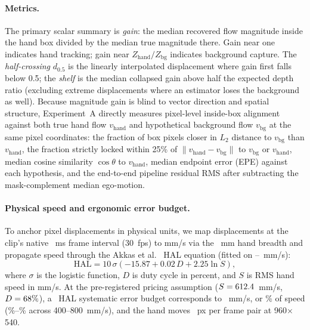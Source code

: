 \documentclass[11pt]{article}
\begin{document}
\paragraph{Metrics.}
The primary scalar summary is \emph{gain}: the median recovered flow magnitude inside the hand box
divided by the median true magnitude there. Gain near one indicates hand tracking; gain near
$Z_{\mathrm{hand}}/Z_{\mathrm{bg}}$ indicates background capture. The \emph{half-crossing}
$d_{0.5}$ is the linearly interpolated displacement where gain first falls below 0.5; the
\emph{shelf} is the median collapsed gain above half the expected depth ratio (excluding extreme
displacements where an estimator loses the background as well). Because magnitude gain is blind
to vector direction and spatial structure, Experiment~A directly measures pixel-level inside-box
alignment against both true hand flow $v_{\mathrm{hand}}$ and hypothetical background flow
$v_{\mathrm{bg}}$ at the same pixel coordinates: the fraction of box pixels closer in $L_2$
distance to $v_{\mathrm{bg}}$ than $v_{\mathrm{hand}}$, the fraction strictly locked within
25\% of $\|v_{\mathrm{hand}} - v_{\mathrm{bg}}\|$ to $v_{\mathrm{bg}}$ or $v_{\mathrm{hand}}$,
median cosine similarity $\cos\theta$ to $v_{\mathrm{hand}}$, median endpoint error (EPE) against
each hypothesis, and the end-to-end pipeline residual RMS after subtracting the mask-complement
median ego-motion.

\paragraph{Physical speed and ergonomic error budget.}
To anchor pixel displacements in physical units, we map displacements at the clip's native
\cgPairInterval{}~ms frame interval (30~fps) to mm/s via the \cgHandBreadth{}~mm hand breadth and
propagate speed through the Akkas et al.\ \citep{akkas2015} HAL equation (fitted on
\cgSpeedLo{}--\cgSpeedHi{}~mm/s):
\begin{equation}
\mathrm{HAL} = 10\,\sigma\!\left(-15.87 + 0.02\,D + 2.25\ln S\right),
\label{eq:hal}
\end{equation}
where $\sigma$ is the logistic function, $D$ is duty cycle in percent, and $S$ is RMS hand speed
in mm/s. At the pre-registered pricing assumption ($S = 612.4{}$~mm/s,
$D = 68{}\%$), a \cgHalBound{}~HAL systematic error budget corresponds to
\cgBudgetMmS{}~mm/s, or \cgBudgetPct{}\% of speed (\cgBudgetPctLo{}\%--\cgBudgetPctHi{}\% across
400--800~mm/s), and the hand moves \cgPxAtMedian{}~px per frame pair at 960$\times$540.
\end{document}
